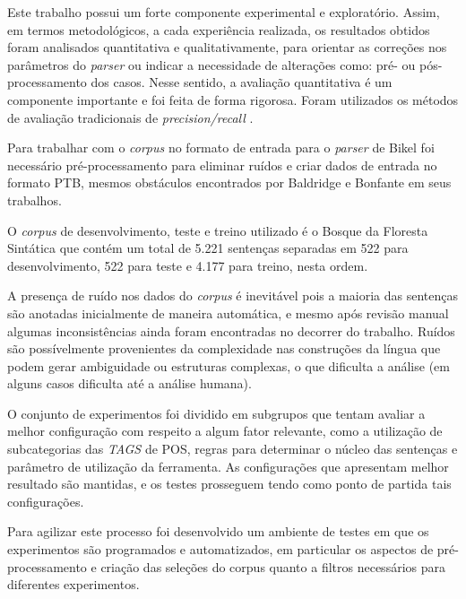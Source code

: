 Este trabalho possui um forte componente experimental e exploratório. Assim, em termos metodológicos, a cada experiência realizada, os resultados obtidos foram analisados quantitativa e qualitativamente, para orientar as correções nos parâmetros do \emph{parser} ou indicar a necessidade de alterações como: pré- ou pós-processamento dos casos. Nesse sentido, a avaliação quantitativa é um componente importante e foi feita de forma rigorosa. Foram utilizados os métodos de avaliação tradicionais de \emph{precision/recall} \cite{black91}.

Para trabalhar com o \emph{corpus} no formato de entrada para o \emph{parser} de Bikel foi necessário pré-processamento para eliminar ruídos e criar dados de entrada no formato PTB, mesmos obstáculos encontrados por Baldridge \cite{baldridge06} e Bonfante\cite{bonfante03} em seus trabalhos. 

O \emph{corpus} de desenvolvimento, teste e treino utilizado é o Bosque da Floresta Sintática que contém um total de 5.221 sentenças separadas em 522 para desenvolvimento, 522 para teste e 4.177 para treino, nesta ordem. 

A presença de ruído nos dados do \emph{corpus} é inevitável pois a maioria das sentenças são anotadas inicialmente de maneira automática, e mesmo após revisão manual algumas inconsistências ainda foram encontradas no decorrer do trabalho. Ruídos são possívelmente provenientes da complexidade nas construções da língua que podem gerar ambiguidade ou estruturas complexas, o que dificulta a análise (em alguns casos dificulta até a análise humana). 

O conjunto de experimentos foi dividido em subgrupos que tentam avaliar a melhor configuração com respeito a algum fator relevante, como a utilização de subcategorias das \emph{TAGS} de POS, regras para determinar o núcleo das sentenças e parâmetro de utilização da ferramenta. As configurações que apresentam melhor resultado são mantidas, e os testes prosseguem tendo como ponto de partida tais configurações.

Para agilizar este processo foi desenvolvido um ambiente de testes em que os experimentos são programados e automatizados, em particular os aspectos de pré-processamento e criação das seleções do corpus quanto a filtros necessários para diferentes experimentos.


